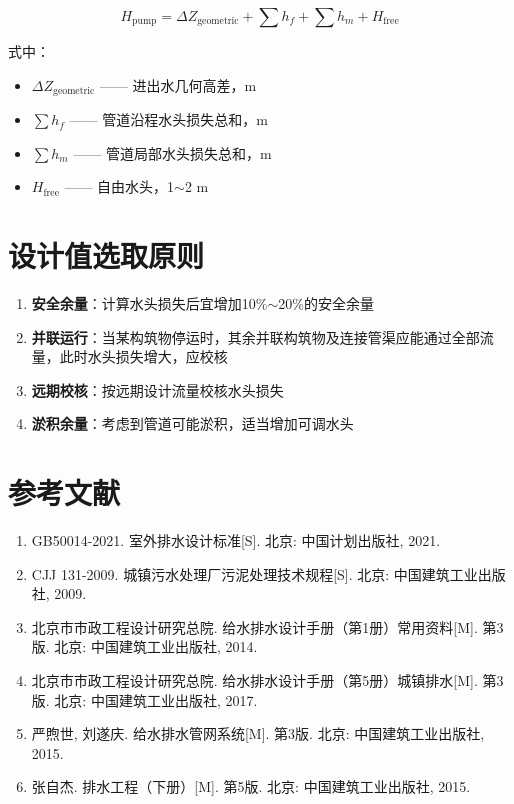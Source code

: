 \documentclass[12pt,a4paper]{ctexart}
\begin{document}
\begin{equation}
    H_{\text{pump}} = \Delta Z_{\text{geometric}} + \sum h_f + \sum h_m + H_{\text{free}}
    \label{eq:pump_head}
\end{equation}

式中：
\begin{itemize}[nosep]
    \item $\Delta Z_{\text{geometric}}$ —— 进出水几何高差，m
    \item $\sum h_f$ —— 管道沿程水头损失总和，m
    \item $\sum h_m$ —— 管道局部水头损失总和，m
    \item $H_{\text{free}}$ —— 自由水头，1$\sim$2 m
\end{itemize}

\section{设计值选取原则}

\begin{enumerate}[nosep]
    \item \textbf{安全余量}：计算水头损失后宜增加10\%$\sim$20\%的安全余量
    \item \textbf{并联运行}：当某构筑物停运时，其余并联构筑物及连接管渠应能通过全部流量，此时水头损失增大，应校核
    \item \textbf{远期校核}：按远期设计流量校核水头损失
    \item \textbf{淤积余量}：考虑到管道可能淤积，适当增加可调水头
\end{enumerate}

\section{参考文献}

\begin{enumerate}[nosep]
    \item GB50014-2021. 室外排水设计标准[S]. 北京: 中国计划出版社, 2021.
    \item CJJ 131-2009. 城镇污水处理厂污泥处理技术规程[S]. 北京: 中国建筑工业出版社, 2009.
    \item 北京市市政工程设计研究总院. 给水排水设计手册（第1册）常用资料[M]. 第3版. 北京: 中国建筑工业出版社, 2014.
    \item 北京市市政工程设计研究总院. 给水排水设计手册（第5册）城镇排水[M]. 第3版. 北京: 中国建筑工业出版社, 2017.
    \item 严煦世, 刘遂庆. 给水排水管网系统[M]. 第3版. 北京: 中国建筑工业出版社, 2015.
    \item 张自杰. 排水工程（下册）[M]. 第5版. 北京: 中国建筑工业出版社, 2015.
\end{enumerate}
\end{document}
